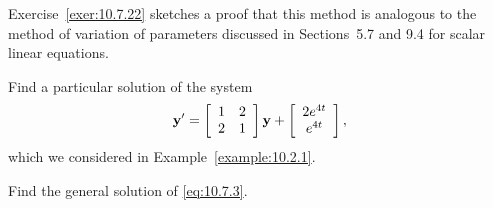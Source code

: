 Exercise~\ref{exer:10.7.22} sketches a proof that this method is analogous to the method of
variation of parameters discussed in Sections~5.7 and 9.4 for scalar linear equations.

\begin{example}
  \label{example:10.7.1} \rm \mbox{}
  \newline
  \begin{alist}
    \item %
    Find a particular solution of the system
    \begin{equation}
      \label{eq:10.7.3}{\bf y}'=\left[\begin{array}{rr} 1&2\\2&1\end{array}\right]{\bf y}+\left[
      \begin{array}{c}
        2e^{4t} \\
        e^{4t}
      \end{array}\right],
    \end{equation}
    which we considered in Example~\ref{example:10.2.1}.

    \item %
    Find the general solution of \eqref{eq:10.7.3}.
  \end{alist}
\end{example}

